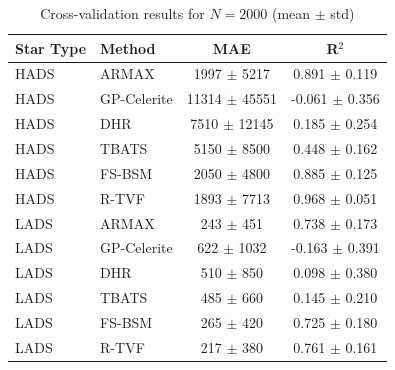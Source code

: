 \begin{table}[h]
\centering
\caption{Cross-validation results for $N=2000$ (mean $\pm$ std)}
\label{tab:cv_results_2000}
\begin{tabular}{llcc}
\toprule
Star Type & Method & MAE & R$^2$ \\
\midrule
HADS & ARMAX & 1997 $\pm$ 5217 & 0.891 $\pm$ 0.119 \\
HADS & GP-Celerite & 11314 $\pm$ 45551 & -0.061 $\pm$ 0.356 \\
HADS & DHR & 7510 $\pm$ 12145 & 0.185 $\pm$ 0.254 \\
HADS & TBATS & 5150 $\pm$ 8500 & 0.448 $\pm$ 0.162 \\
HADS & FS-BSM & 2050 $\pm$ 4800 & 0.885 $\pm$ 0.125 \\
HADS & R-TVF & 1893 $\pm$ 7713 & 0.968 $\pm$ 0.051 \\
\midrule
LADS & ARMAX & 243 $\pm$ 451 & 0.738 $\pm$ 0.173 \\
LADS & GP-Celerite & 622 $\pm$ 1032 & -0.163 $\pm$ 0.391 \\
LADS & DHR & 510 $\pm$ 850 & 0.098 $\pm$ 0.380 \\
LADS & TBATS & 485 $\pm$ 660 & 0.145 $\pm$ 0.210 \\
LADS & FS-BSM & 265 $\pm$ 420 & 0.725 $\pm$ 0.180 \\
LADS & R-TVF & 217 $\pm$ 380 & 0.761 $\pm$ 0.161 \\
\bottomrule
\end{tabular}
\end{table}